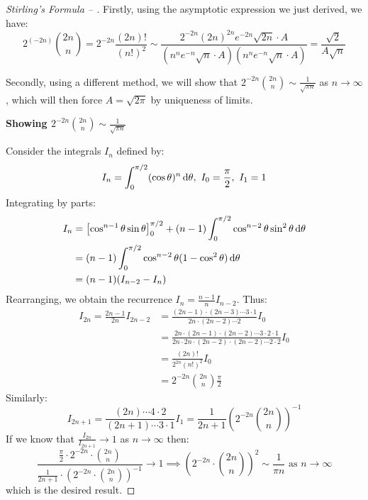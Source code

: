 \documentclass[../main.tex]{subfiles}
\begin{document}
\begin{proof}[Stirling's Formula -- ]
  Firstly, using the asymptotic expression we just derived, we have:
  \[
    2^{(-2n)}\binom{2n}{n} = 2^{-2n} \frac{(2n)!}{(n!)^2} \sim \frac{2^{-2n} (2n)^{2n} e^{-2n} \sqrt{2n} \cdot A}{(n^{n} e^{-n}\sqrt{n} \cdot A)(n^{n} e^{-n}\sqrt{n} \cdot A)} = \frac{\sqrt{2}}{A\sqrt{n}}
  \]

  Secondly, using a different method, we will show that $2^{-2n}\binom{2n}{n} \sim \frac{1}{\sqrt{\pi n}}$ as $n \to \infty$, which will then force $A = \sqrt{2\pi}$ by uniqueness of limits.

  \textbf{Showing $2^{-2n} \binom{2n}{n} \sim \frac{1}{\sqrt{\pi n}}$}\par
  Consider the integrals $I_n$ defined by:
  \[
    I_n = \int_{0}^{\pi/2} (\cos \theta)^{n} \d{\theta},\ I_0 = \frac{\pi}{2},\  I_1 = 1
  \]
  Integrating by parts:
  \begin{align*}
    I_n &= \eval{\cos^{n - 1} \theta \sin \theta}{0}{\pi/2} + (n - 1)\int_{0}^{\pi/2} \cos^{n - 2} \theta \sin^2 \theta \d{\theta} \\
        &= (n - 1) \int_{0}^{\pi/2} \cos^{n - 2} \theta (1 - \cos^2 \theta) \d{\theta} \\
        &= (n - 1)(I_{n - 2} - I_n)
  \end{align*}
  Rearranging, we obtain the recurrence $I_n = \frac{n - 1}{n} I_{n - 2}$.
  Thus:
  \begin{align*}
    I_{2n} = \frac{2n - 1}{2n} I_{2n - 2} &= \frac{(2n - 1) \cdot (2n - 3) \cdots 3 \cdot 1}{2n \cdot (2n - 2) \cdots 2} I_0 \\
                                          &= \frac{2n \cdot (2n - 1) \cdot (2n - 2) \cdots 3 \cdot 2\cdot 1}{2n \cdot 2n \cdot (2n - 2) \cdot (2n - 2) \cdots 2 \cdot 2} I_0 \\
                                          &= \frac{(2n)!}{2^{2n} (n!)^2} I_0  \\
                                          &= 2^{-2n} \binom{2n}{n} \frac{\pi}{2}
  \end{align*}
  Similarly:
  \[
    I_{2n + 1} = \frac{(2n) \cdots 4 \cdot 2}{(2n + 1) \cdots 3\cdot 1} I_1 = \frac{1}{2n + 1} \left(2^{-2n} \binom{2n}{n}\right)^{-1}
  \]
  If we know that $\frac{I_{2n}}{I_{2n + 1}} \to 1$ as $n \to \infty$ then:
  \[
    \frac{\frac{\pi}{2} \cdot 2^{-2n} \cdot \binom{2n}{n}}{\frac{1}{2n + 1} \cdot \left(2^{-2n} \cdot \binom{2n}{n}\right)^{-1}} \to 1 \implies \left(2^{-2n} \cdot \binom{2n}{n}\right)^{2} \sim \frac{1}{\pi n} \text{ as $n \to \infty$}
  \]
  which is the desired result.


\end{proof}
\end{document}
